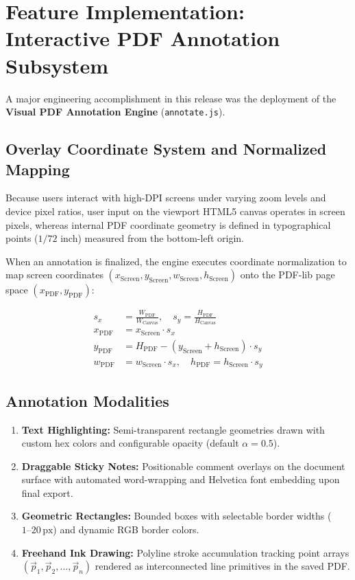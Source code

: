 \documentclass[11pt,a4paper]{article}
\begin{document}
\section{Feature Implementation: Interactive PDF Annotation Subsystem}
\label{sec:annotate}

A major engineering accomplishment in this release was the deployment of the \textbf{Visual PDF Annotation Engine} (\texttt{annotate.js}). 

\subsection{Overlay Coordinate System and Normalized Mapping}
Because users interact with high-DPI screens under varying zoom levels and device pixel ratios, user input on the viewport HTML5 canvas operates in screen pixels, whereas internal PDF coordinate geometry is defined in typographical points ($1/72$ inch) measured from the bottom-left origin.

When an annotation is finalized, the engine executes coordinate normalization to map screen coordinates $(x_{\text{Screen}}, y_{\text{Screen}}, w_{\text{Screen}}, h_{\text{Screen}})$ onto the PDF-lib page space $(x_{\text{PDF}}, y_{\text{PDF}})$:

\begin{align}
    s_x &= \frac{W_{\text{PDF}}}{W_{\text{Canvas}}}, \quad s_y = \frac{H_{\text{PDF}}}{H_{\text{Canvas}}} \\
    x_{\text{PDF}} &= x_{\text{Screen}} \cdot s_x \\
    y_{\text{PDF}} &= H_{\text{PDF}} - (y_{\text{Screen}} + h_{\text{Screen}}) \cdot s_y \\
    w_{\text{PDF}} &= w_{\text{Screen}} \cdot s_x, \quad h_{\text{PDF}} = h_{\text{Screen}} \cdot s_y
\end{align}

\subsection{Annotation Modalities}
\begin{enumerate}
    \item \textbf{Text Highlighting:} Semi-transparent rectangle geometries drawn with custom hex colors and configurable opacity (default $\alpha = 0.5$).
    \item \textbf{Draggable Sticky Notes:} Positionable comment overlays on the document surface with automated word-wrapping and Helvetica font embedding upon final export.
    \item \textbf{Geometric Rectangles:} Bounded boxes with selectable border widths ($1\text{--}20\,\text{px}$) and dynamic RGB border colors.
    \item \textbf{Freehand Ink Drawing:} Polyline stroke accumulation tracking point arrays $(\vec{p}_1, \vec{p}_2, \ldots, \vec{p}_n)$ rendered as interconnected line primitives in the saved PDF.
\end{enumerate}
\end{document}
